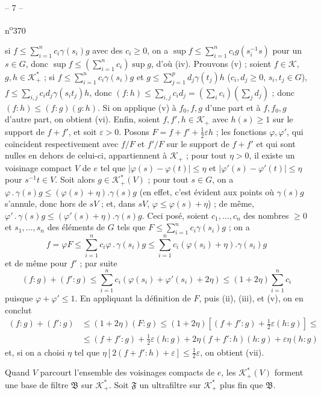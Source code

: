 \begin{center}-- 7 --\end{center}\hfill n\textsuperscript{o}370

si $f\leq\sum_{i=1}^n c_i\gamma(s_i)g$ avec des $c_i\geq0$, on a $\sup f\leq\sum_{i=1}^n c_i g(s_i^{-1}s)$ pour un $s\in G$, donc $\sup f\leq(\sum_{i=1}^n c_i)\sup g$, d'où (iv). Prouvons (v) ; soient $f\in\mathcal K$, $g,h\in\mathcal K^*_+$ ; si $f\leq\sum_{i=1}^n c_i\gamma(s_i)g$ et $g\leq\sum_{j=1}^p d_j\gamma(t_j)h$ ($c_i,d_j\geq0$, $s_i,t_j\in G$), $f\leq\sum_{i,j}c_i d_j\gamma(s_it_j)h$, donc $(f:h)\leq\sum_{i,j}c_i d_j=(\sum_i c_i)(\sum_j d_j)$ ; donc $(f:h)\leq(f:g)(g:h)$. Si on applique (v) à $f_0,f,g$ d'une part et à $f,f_0,g$ d'autre part, on obtient (vi). Enfin, soient $f,f',h\in\mathcal K_+$ avec $h(s)\geq1$ sur le support de $f+f'$, et soit $\varepsilon>0$. Posons $F=f+f'+\frac12\varepsilon h$ ; les fonctions $\varphi,\varphi'$, qui coïncident respectivement avec $f/F$ et $f'/F$ sur le support de $f+f'$ et qui sont nulles en dehors de celui-ci, appartiennent à $\mathcal K_+$ ; pour tout $\eta>0$, il existe un voisinage compact $V$ de $e$ tel que $|\varphi(s)-\varphi(t)|\leq\eta$ et $|\varphi'(s)-\varphi'(t)|\leq\eta$ pour $s^{-1}t\in V$. Soit alors $g\in\mathcal K^*_+(V)$ ; pour tout $s\in G$, on a $\varphi\mathbin{.}\gamma(s)g\leq(\varphi(s)+\eta).\gamma(s)g$ (en effet, c'est évident aux points où $\gamma(s)g$ s'annule, donc hors de $sV$ ; et, dans $sV$, $\varphi\leq\varphi(s)+\eta$) ; de même, $\varphi'\mathbin{.}\gamma(s)g\leq(\varphi'(s)+\eta).\gamma(s)g$. Ceci posé, soient $c_1,\ldots,c_n$ des nombres $\geq0$ et $s_1,\ldots,s_n$ des éléments de $G$ tels que $F\leq\sum_{i=1}^n c_i\gamma(s_i)g$ ; on a
\[
f=\varphi F\leq\sum_{i=1}^n c_i\varphi\mathbin{.}\gamma(s_i)g\leq\sum_{i=1}^n c_i(\varphi(s_i)+\eta).\gamma(s_i)g
\]
et de même pour $f'$ ; par suite
\[
(f:g)+(f':g)\leq\sum_{i=1}^n c_i(\varphi(s_i)+\varphi'(s_i)+2\eta)\leq(1+2\eta)\sum_{i=1}^n c_i
\]
puisque $\varphi+\varphi'\leq1$. En appliquant la définition de $F$, puis (ii), (iii), et (v), on en conclut
\[
\begin{aligned}
(f:g)+(f':g)&\leq(1+2\eta)(F:g)\leq(1+2\eta)\left[(f+f':g)+\frac12\varepsilon(h:g)\right]\leq\\
&\leq(f+f':g)+\frac12\varepsilon(h:g)+2\eta(f+f':h)(h:g)+\varepsilon\eta(h:g)
\end{aligned}
\]
et, si on a choisi $\eta$ tel que $\eta[2(f+f':h)+\varepsilon]\leq\frac12\varepsilon$, on obtient (vii).

Quand $V$ parcourt l'ensemble des voisinages compacts de $e$, les $\mathcal K^*_+(V)$ forment une base de filtre $\mathfrak B$ sur $\mathcal K^*_+$. Soit $\mathfrak F$ un ultrafiltre sur $\mathcal K^*_+$ plus fin que $\mathfrak B$.
